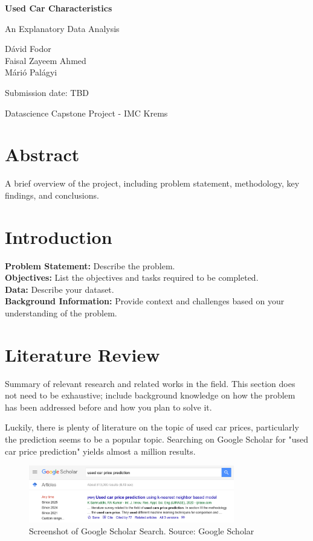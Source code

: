 \documentclass[12pt]{article}
\begin{document}
\begin{titlepage}
  \centering
  \vspace*{1in}
  {\Huge\bfseries Used Car Characteristics\par}
  \vspace{0.5em}
  {\Large An Explanatory Data Analysis\par}
  \vspace{1.5in}
  {\Large Dávid Fodor \\ Faisal Zayeem Ahmed \\ Márió Palágyi\par}
  \vfill
  {\large Submission date: TBD\par}
  \vspace{0.5in}
  {\large Datascience Capstone Project - IMC Krems}  %
\end{titlepage}

\section*{Abstract}
A brief overview of the project, including problem statement, methodology, key findings, and conclusions.

\section{Introduction}
\textbf{Problem Statement:} Describe the problem.\\[1ex]
\textbf{Objectives:} List the objectives and tasks required to be completed.\\[1ex]
\textbf{Data:} Describe your dataset.\\[1ex]
\textbf{Background Information:} Provide context and challenges based on your understanding of the problem.

\section{Literature Review}
Summary of relevant research and related works in the field. This section does not need to be exhaustive; include background knowledge on how the problem has been addressed before and how you plan to solve it.

Luckily, there is plenty of literature on the topic of used car prices, particularly the prediction seems to be a popular topic. Searching on Google Scholar for "used car price prediction" yields almost a million results.

\begin{figure}[ht]
  \centering
  \includegraphics[width=0.8\textwidth]{./images/google_scholar.png}
  \caption{Screenshot of Google Scholar Search. Source: Google Scholar}
  \label{fig:google_scholar}
\end{figure}
\end{document}
